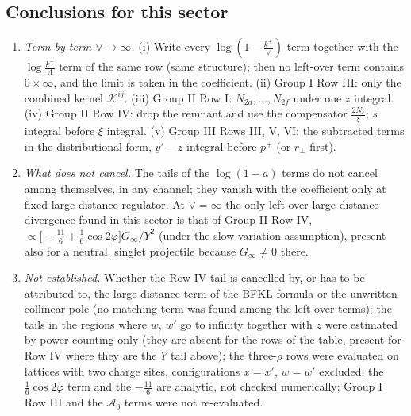 \documentclass[9pt]{article}
\numberwithin{equation}{section}
\begin{document}
\subsection{Conclusions for this sector}
\begin{enumerate}
\item \emph{Term-by-term $\vee\to\infty$.} (i) Write every $\log(1-\frac{k^{+}}{\vee})$ term together with the $\log\frac{k^{+}}{\Lambda}$ term of the same row (same structure); then no left-over term contains $0\times\infty$, and the limit is taken in the coefficient. (ii) Group I Row III: only the combined kernel $\mathcal K^{ij}$. (iii) Group II Row I: $N_{2a},\dots,N_{2f}$ under one $z$ integral. (iv) Group II Row IV: drop the remnant and use the compensator $\frac{2N_{c}}{\xi}$; $s$ integral before $\xi$ integral. (v) Group III Rows III, V, VI: the subtracted terms in the distributional form, $y'-z$ integral before $p^{+}$ (or $r_{\perp}$ first).
\item \emph{What does not cancel.} The tails of the $\log(1-a)$ terms do not cancel among themselves, in any channel; they vanish with the coefficient only at fixed large-distance regulator. At $\vee=\infty$ the only left-over large-distance divergence found in this sector is that of Group II Row IV, $\propto\big[-\frac{11}{6}+\frac16\cos2\varphi\big]G_{\infty}/Y^{2}$ (under the slow-variation assumption), present also for a neutral, singlet projectile because $G_{\infty}\neq0$ there.
\item \emph{Not established.} Whether the Row IV tail is cancelled by, or has to be attributed to, the large-distance term of the BFKL formula or the unwritten collinear pole (no matching term was found among the left-over terms); the tails in the regions where $w$, $w'$ go to infinity together with $z$ were estimated by power counting only (they are absent for the rows of the table, present for Row IV where they are the $Y$ tail above); the three-$\rho$ rows were evaluated on lattices with two charge sites, configurations $x=x'$, $w=w'$ excluded; the $\frac16\cos2\varphi$ term and the $-\frac{11}{6}$ are analytic, not checked numerically; Group I Row III and the $\mathcal A_{0}$ terms were not re-evaluated.
\end{enumerate}
\end{document}
